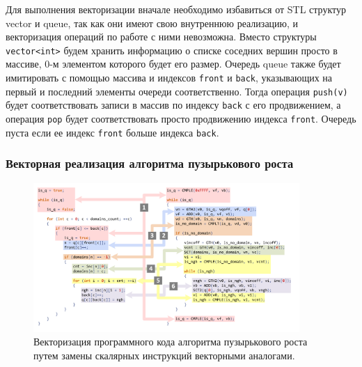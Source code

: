 Для выполнения векторизации вначале необходимо избавиться от STL структур vector и queue, так как они имеют свою внутреннюю реализацию, и векторизация операций по работе с ними невозможна.
Вместо структуры \texttt{vector<int>} будем хранить информацию о списке соседних вершин просто в массиве, 0-м элементом которого будет его размер.
Очередь queue также будет имитировать с помощью массива и индексов \texttt{front} и \texttt{back}, указывающих на первый и последний элементы очереди соответственно.
Тогда операция \texttt{push(v)} будет соответствовать записи в массив по индексу \texttt{back} с его продвижением, а операция \texttt{pop} будет соответствовать просто продвижению индекса \texttt{front}.
Очередь пуста если ее индекс \texttt{front} больше индекса \texttt{back}.

\subsubsection{Векторная реализация алгоритма пузырькового роста}

\begin{figure}[ht]
\centering
\includegraphics[width=0.90\textwidth]{pics/text_4_vec_integer/code.pdf}
\singlespacing
{}\caption{Векторизация программного кода алгоритма пузырькового роста путем замены скалярных инструкций векторными аналогами.}
\label{fig:text_4_vec_integer_code}
\end{figure}

